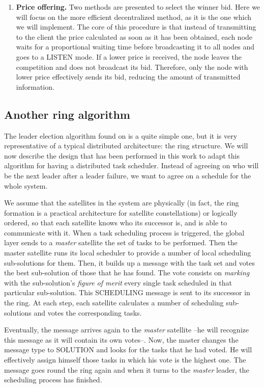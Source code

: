 \begin{enumerate}
\item \textbf{Price offering. } Two methods are presented to select the winner bid. Here we will focus on the more efficient decentralized method, as it is the one which we will implement. The core of this procedure is that instead of transmitting to the client the price calculated as soon as it has been obtained, each node waits for a proportional waiting time before broadcasting it to all nodes and goes to a LISTEN mode. If a lower price is received, the node leaves the competition and does not broadcast its bid. Therefore, only the node with lower price effectively sends its bid, reducing the amount of transmitted information.
\end{enumerate}


\subsection{Another ring algorithm}
The leader election algorithm found on \cite{Tanenbaum:2006:DSP:1202502} is a quite simple one, but it is very representative of a typical distributed architecture: the ring structure. We will now describe the design that has been performed in this work to adapt this algorithm for having a distributed task scheduler. Instead of agreeing on who will be the next leader after a leader failure, we want to agree on a schedule for the whole system.

We assume that the satellites in the system are physically (in fact, the ring formation is a practical architecture for satellite constellations) or logically ordered, so that each satellite knows who its successor is, and is able to communicate with it. When a task scheduling process is triggered, the global layer sends to a \emph{master} satellite the set of tasks to be performed. Then the master satellite runs its local scheduler to provide a number of local scheduling sub-solutions for them. Then, it builds up a message with the task set and votes the best sub-solution of those that he has found. The vote consists on \emph{marking} with the sub-solution's \emph{figure of merit} every single task scheduled in that particular sub-solution. This SCHEDULING message is sent to its successor in the ring. At each step, each satellite calculates a number of scheduling sub-solutions and votes the corresponding tasks.

Eventually, the message arrives again to the \emph{master} satellite --he will recognize this message as it will contain its own votes--. Now, the master changes the message type to SOLUTION and looks for the tasks that he had voted. He will effectively assign himself those tasks in which his vote is the highest one. The message goes round the ring again and when it turns to the \emph{master} leader, the scheduling process has finished.

